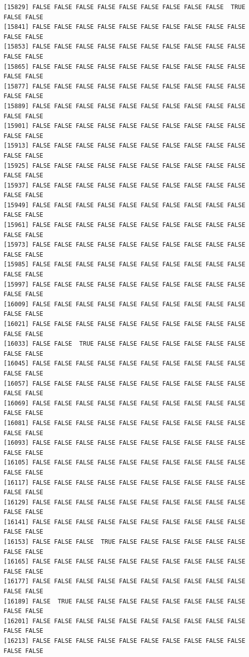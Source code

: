 \documentclass[
  a4paper,
  DIV=11,
  numbers=noendperiod]{scrartcl}
\begin{document}
\begin{verbatim}
[15829] FALSE FALSE FALSE FALSE FALSE FALSE FALSE FALSE FALSE  TRUE FALSE FALSE
[15841] FALSE FALSE FALSE FALSE FALSE FALSE FALSE FALSE FALSE FALSE FALSE FALSE
[15853] FALSE FALSE FALSE FALSE FALSE FALSE FALSE FALSE FALSE FALSE FALSE FALSE
[15865] FALSE FALSE FALSE FALSE FALSE FALSE FALSE FALSE FALSE FALSE FALSE FALSE
[15877] FALSE FALSE FALSE FALSE FALSE FALSE FALSE FALSE FALSE FALSE FALSE FALSE
[15889] FALSE FALSE FALSE FALSE FALSE FALSE FALSE FALSE FALSE FALSE FALSE FALSE
[15901] FALSE FALSE FALSE FALSE FALSE FALSE FALSE FALSE FALSE FALSE FALSE FALSE
[15913] FALSE FALSE FALSE FALSE FALSE FALSE FALSE FALSE FALSE FALSE FALSE FALSE
[15925] FALSE FALSE FALSE FALSE FALSE FALSE FALSE FALSE FALSE FALSE FALSE FALSE
[15937] FALSE FALSE FALSE FALSE FALSE FALSE FALSE FALSE FALSE FALSE FALSE FALSE
[15949] FALSE FALSE FALSE FALSE FALSE FALSE FALSE FALSE FALSE FALSE FALSE FALSE
[15961] FALSE FALSE FALSE FALSE FALSE FALSE FALSE FALSE FALSE FALSE FALSE FALSE
[15973] FALSE FALSE FALSE FALSE FALSE FALSE FALSE FALSE FALSE FALSE FALSE FALSE
[15985] FALSE FALSE FALSE FALSE FALSE FALSE FALSE FALSE FALSE FALSE FALSE FALSE
[15997] FALSE FALSE FALSE FALSE FALSE FALSE FALSE FALSE FALSE FALSE FALSE FALSE
[16009] FALSE FALSE FALSE FALSE FALSE FALSE FALSE FALSE FALSE FALSE FALSE FALSE
[16021] FALSE FALSE FALSE FALSE FALSE FALSE FALSE FALSE FALSE FALSE FALSE FALSE
[16033] FALSE FALSE  TRUE FALSE FALSE FALSE FALSE FALSE FALSE FALSE FALSE FALSE
[16045] FALSE FALSE FALSE FALSE FALSE FALSE FALSE FALSE FALSE FALSE FALSE FALSE
[16057] FALSE FALSE FALSE FALSE FALSE FALSE FALSE FALSE FALSE FALSE FALSE FALSE
[16069] FALSE FALSE FALSE FALSE FALSE FALSE FALSE FALSE FALSE FALSE FALSE FALSE
[16081] FALSE FALSE FALSE FALSE FALSE FALSE FALSE FALSE FALSE FALSE FALSE FALSE
[16093] FALSE FALSE FALSE FALSE FALSE FALSE FALSE FALSE FALSE FALSE FALSE FALSE
[16105] FALSE FALSE FALSE FALSE FALSE FALSE FALSE FALSE FALSE FALSE FALSE FALSE
[16117] FALSE FALSE FALSE FALSE FALSE FALSE FALSE FALSE FALSE FALSE FALSE FALSE
[16129] FALSE FALSE FALSE FALSE FALSE FALSE FALSE FALSE FALSE FALSE FALSE FALSE
[16141] FALSE FALSE FALSE FALSE FALSE FALSE FALSE FALSE FALSE FALSE FALSE FALSE
[16153] FALSE FALSE FALSE  TRUE FALSE FALSE FALSE FALSE FALSE FALSE FALSE FALSE
[16165] FALSE FALSE FALSE FALSE FALSE FALSE FALSE FALSE FALSE FALSE FALSE FALSE
[16177] FALSE FALSE FALSE FALSE FALSE FALSE FALSE FALSE FALSE FALSE FALSE FALSE
[16189] FALSE  TRUE FALSE FALSE FALSE FALSE FALSE FALSE FALSE FALSE FALSE FALSE
[16201] FALSE FALSE FALSE FALSE FALSE FALSE FALSE FALSE FALSE FALSE FALSE FALSE
[16213] FALSE FALSE FALSE FALSE FALSE FALSE FALSE FALSE FALSE FALSE FALSE FALSE

\end{verbatim}
\end{document}
